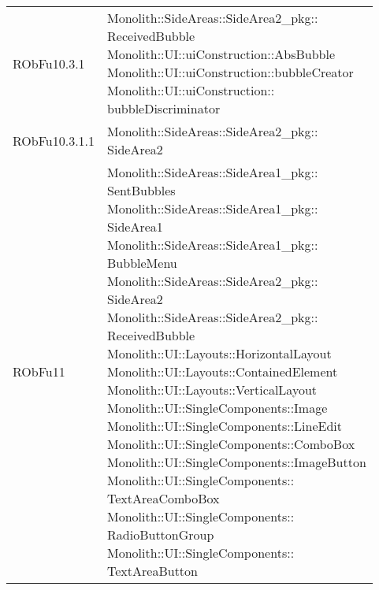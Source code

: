 \begin{center}
\begin{longtable}{|
*{1}{>{\centering\arraybackslash}m{2.5cm}|}
*{1}{>{\centering\arraybackslash}m{7.5cm}|}}
{\\Monolith::SideAreas::SideArea2\_pkg:: \\ \hfill SideArea2
\\}\\\hline
RObFu10.3.1 & \makecell[l]{Monolith::SideAreas::SideArea2\_pkg:: \\ \hfill ReceivedBubble
\\Monolith::UI::uiConstruction::AbsBubble
\\Monolith::UI::uiConstruction::bubbleCreator
\\Monolith::UI::uiConstruction:: \\ \hfill bubbleDiscriminator
\\}\\\hline
RObFu10.3.1.1 & \makecell[l]{Monolith::SideAreas::SideArea2\_pkg:: \\ \hfill SideArea2
\\}\\\hline
RObFu11 & \makecell[l]{Monolith::SideAreas::SideArea1\_pkg:: \\ \hfill SentBubbles
\\Monolith::SideAreas::SideArea1\_pkg:: \\ \hfill SideArea1
\\Monolith::SideAreas::SideArea1\_pkg:: \\ \hfill BubbleMenu
\\Monolith::SideAreas::SideArea2\_pkg:: \\ \hfill SideArea2
\\Monolith::SideAreas::SideArea2\_pkg:: \\ \hfill ReceivedBubble
\\Monolith::UI::Layouts::HorizontalLayout
\\Monolith::UI::Layouts::ContainedElement
\\Monolith::UI::Layouts::VerticalLayout
\\Monolith::UI::SingleComponents::Image
\\Monolith::UI::SingleComponents::LineEdit
\\Monolith::UI::SingleComponents::ComboBox
\\Monolith::UI::SingleComponents::ImageButton
\\Monolith::UI::SingleComponents:: \\ \hfill TextAreaComboBox
\\Monolith::UI::SingleComponents:: \\ \hfill RadioButtonGroup
\\Monolith::UI::SingleComponents:: \\ \hfill TextAreaButton
}
\end{longtable}
\end{center}
